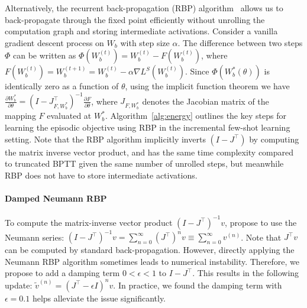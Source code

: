 Alternatively, the recurrent back-propagation (RBP) algorithm~\citep{rbp2,rbp3,rbp} allows us to
back-propagate through the fixed point efficiently without unrolling the computation graph and
storing intermediate activations. Consider a vanilla gradient descent process on $W_b$ with step
size $\alpha$. The difference between two steps $\Phi$ can be written as $\Phi(W_b^{(t)}) =
W_b^{(t)} - F(W_b^{(t)})$, where $F(W_b^{(t)}) =W_b^{(t+1)} = W_b^{(t)} - \alpha \nabla
L^S(W_b^{(t)})$. Since $\Phi(W_b^{*}(\theta))$ is identically zero as a function of $\theta$,
using the implicit function theorem we have $\frac{\partial W_b^*}{\partial \theta} =
(I-J_{F,W_b^*}^\top)^{-1} \frac{\partial F}{\partial \theta}$, where $J_{F,W_b^*}$ denotes the
Jacobian matrix of the mapping $F$ evaluated at $W_b^*$. Algorithm~\ref{alg:energy} outlines the key
steps for learning the episodic objective using RBP in the incremental few-shot learning setting.
Note that the RBP algorithm implicitly inverts $(I-J^\top)$ by computing the matrix inverse vector
product, and has the same time complexity compared to truncated BPTT given the same number of
unrolled steps, but meanwhile RBP does not have to store intermediate activations.

\paragraph{Damped Neumann RBP}
To compute the matrix-inverse vector product $(I - J^\top)^{-1} v$, \citet{rbp} propose to use the
Neumann series: $(I-J^\top)^{-1}v  = \sum_{n=0}^\infty (J^\top)^{n}v \equiv \sum_{n=0}^\infty
v^{(n)}$. Note that $J^\top v$ can be computed by standard back-propagation. However, directly
applying the Neumann RBP algorithm sometimes leads to numerical instability. Therefore, we propose
to add a damping term $0 < \epsilon < 1$ to $I-J^\top$. This results in the following update:
$\tilde{v}^{(n)} = (J^\top - \epsilon I)^{n}v$. In practice, we found the damping term with
$\epsilon = 0.1$ helps alleviate the issue significantly.